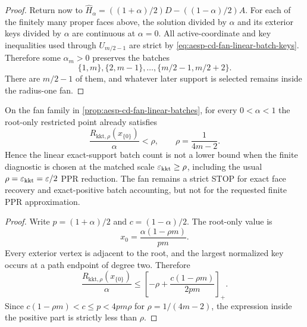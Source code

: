 \begin{proof}
Return now to
$\widehat H_\alpha=((1+\alpha)/2)D-((1-\alpha)/2)A$.
For each of the finitely many proper faces above, the solution divided by
$\alpha$ and its exterior keys divided by $\alpha$ are continuous at
$\alpha=0$.  All active-coordinate and key inequalities used through
$U_{m/2-1}$ are strict by
\cref{eq:aesp-cd-fan-linear-batch-keys}.  Therefore some
$\alpha_m>0$ preserves the batches
\begin{equation*}
 \{1,m\},\{2,m-1\},\ldots,
 \{m/2-1,m/2+2\}.
\end{equation*}
There are $m/2-1$ of them, and whatever later support is selected remains
inside the radius-one fan.
\end{proof}

\begin{corollary}
\label{cor:aesp-cd-fan-finite-stop}
On the fan family in
\cref{prop:aesp-cd-fan-linear-batches}, for every \(0<\alpha<1\) the
root-only restricted point already satisfies
\begin{equation*}
 \frac{R_{\mathrm{kkt},\rho}(x_{\{0\}})}{\alpha}<\rho,
 \qquad \rho=\frac1{4m-2}.
\end{equation*}
Hence the linear exact-support batch count is not a lower bound when the
finite diagnostic is chosen at the matched scale
\(\varepsilon_{\mathrm{kkt}}\geq\rho\), including the usual
\(\rho=\varepsilon_{\mathrm{kkt}}=\varepsilon/2\) PPR reduction.  The fan remains a strict
STOP for exact face recovery and exact-positive batch accounting, but not for
the requested finite PPR approximation.
\end{corollary}

\begin{proof}
Write \(p=(1+\alpha)/2\) and \(c=(1-\alpha)/2\).  The root-only value is
\begin{equation*}
 x_0=\frac{\alpha(1-\rho m)}{pm}.
\end{equation*}
Every exterior vertex is adjacent to the root, and the largest normalized
key occurs at a path endpoint of degree two.  Therefore
\begin{equation*}
 \frac{R_{\mathrm{kkt},\rho}(x_{\{0\}})}{\alpha}
 \leq
 \left[-\rho+\frac{c(1-\rho m)}{2pm}\right]_+.
\end{equation*}
Since \(c(1-\rho m)<c\leq p<4pm\rho\) for
\(\rho=1/(4m-2)\), the expression inside the positive part is strictly less
than \(\rho\).
\end{proof}

